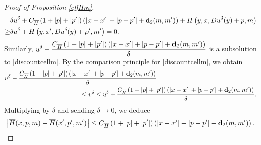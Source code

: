 \documentclass[reqno,11pt]{amsart}
\numberwithin{equation}{section}
\renewcommand{\bar}{\overline}
\begin{document}
\begin{proof}[Proof of Proposition \ref{effHm}]
\[
\begin{aligned}
&\delta u^\delta+ C_{\bar{H}}\left(1+|p|+|p'|\right)\left(\left|x-x'\right|+\left|p-p'\right|+{\bf d}_2(m,m')\right)+ H\left(y,x, Du^\delta(y) +p,m\right)\\
\geq & \delta u^\delta+H\left(y,x', Du^\delta(y) +p',m'\right)=0.
\end{aligned}
\]
Similarly, $\displaystyle u^\delta -\frac{C_{\bar{H}}\left(1+|p|+|p'|\right)\left(\left|x-x'\right|+\left|p-p'\right|+{\bf d}_2(m,m')\right)}{\delta}$ is a subsolution to \eqref{discountcellm}. By the comparison principle for \eqref{discountcellm}, we obtain
\[
\begin{aligned}
    &u^\delta -\frac{C_{\bar{H}}\left(1+|p|+|p'|\right)\left(\left|x-x'\right|+\left|p-p'\right|+{\bf d}_2(m,m')\right)}{\delta}  \\
    &\qquad \qquad\qquad\qquad\qquad\qquad \leq v^\delta  \leq u^\delta +\frac{C_{\bar{H}}\left(1+|p|+|p'|\right)\left(\left|x-x'\right|+\left|p-p'\right|+{\bf d}_2(m,m')\right)}{\delta}.
\end{aligned}
\]
Multiplying by $\delta$ and sending $\delta \to 0 $, we deduce
\[
 \left|\bar{H}(x,p,m) - \bar{H}(x', p',m')\right| \leq C_{\bar{H}}\left(1+|p|+|p'|\right)\left(\left|x-x'\right|+\left|p-p'\right|+{\bf d}_2(m,m')\right).
\]
\end{proof}
\end{document}
